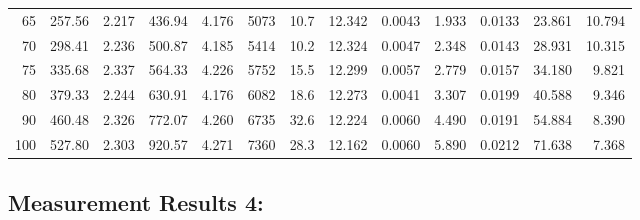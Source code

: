 \documentclass[10pt]{article}
\begin{document}
{\begin{tabular}{|r|rr|rr|rr|rr|rr|r|r|}
       65 &       257.56 &        2.217 &       436.94 &        4.176 &         5073 &         10.7 &       12.342 &       0.0043 &        1.933 &       0.0133 &       23.861 &       10.794 \\
       70 &       298.41 &        2.236 &       500.87 &        4.185 &         5414 &         10.2 &       12.324 &       0.0047 &        2.348 &       0.0143 &       28.931 &       10.315 \\
       75 &       335.68 &        2.337 &       564.33 &        4.226 &         5752 &         15.5 &       12.299 &       0.0057 &        2.779 &       0.0157 &       34.180 &        9.821 \\
       80 &       379.33 &        2.244 &       630.91 &        4.176 &         6082 &         18.6 &       12.273 &       0.0041 &        3.307 &       0.0199 &       40.588 &        9.346 \\
       90 &       460.48 &        2.326 &       772.07 &        4.260 &         6735 &         32.6 &       12.224 &       0.0060 &        4.490 &       0.0191 &       54.884 &        8.390 \\
      100 &       527.80 &        2.303 &       920.57 &        4.271 &         7360 &         28.3 &       12.162 &       0.0060 &        5.890 &       0.0212 &       71.638 &        7.368 \\
\hline
\end{tabular}
}



\subsection*{\large \bf Measurement Results 4:}
\end{document}
